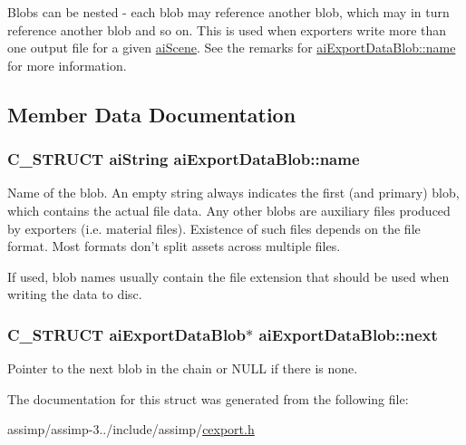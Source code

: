 Blobs can be nested -\/ each blob may reference another blob, which may in turn reference another blob and so on. This is used when exporters write more than one output file for a given \hyperlink{structai_scene}{ai\+Scene}. See the remarks for \hyperlink{structai_export_data_blob_af7f006ac5ad818c0d81d520a84f74c3e}{ai\+Export\+Data\+Blob\+::name} for more information. 

\subsection{Member Data Documentation}
\hypertarget{structai_export_data_blob_af7f006ac5ad818c0d81d520a84f74c3e}{
\subsubsection[{name}]{\setlength{\rightskip}{0pt plus 5cm}C\+\_\+\+S\+T\+R\+U\+C\+T {\bf ai\+String} ai\+Export\+Data\+Blob\+::name}}\label{structai_export_data_blob_af7f006ac5ad818c0d81d520a84f74c3e}
Name of the blob. An empty string always indicates the first (and primary) blob, which contains the actual file data. Any other blobs are auxiliary files produced by exporters (i.\+e. material files). Existence of such files depends on the file format. Most formats don't split assets across multiple files.

If used, blob names usually contain the file extension that should be used when writing the data to disc. \hypertarget{structai_export_data_blob_a3e98fa760f45983ff1bccec6715f3817}{
\subsubsection[{next}]{\setlength{\rightskip}{0pt plus 5cm}C\+\_\+\+S\+T\+R\+U\+C\+T {\bf ai\+Export\+Data\+Blob}$\ast$ ai\+Export\+Data\+Blob\+::next}}\label{structai_export_data_blob_a3e98fa760f45983ff1bccec6715f3817}
Pointer to the next blob in the chain or N\+U\+L\+L if there is none. 

The documentation for this struct was generated from the following file\+:\begin{DoxyCompactItemize}
\item 
assimp/assimp-\/3../include/assimp/\hyperlink{cexport_8h}{cexport.\+h}\end{DoxyCompactItemize}
